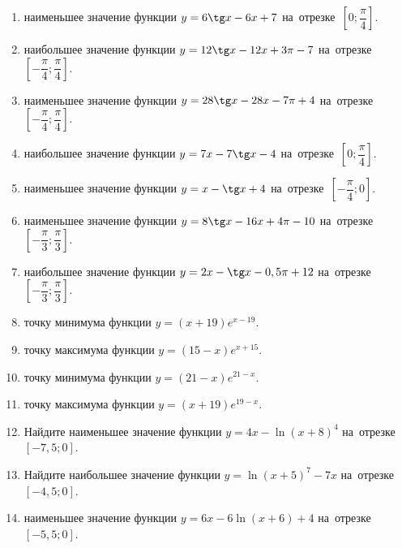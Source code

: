 \documentclass[a4paper,10pt]{article}
\begin{document}
\begin{enumerate}
\item {} наименьшее значение функции $y=6\tg x-6x+7$ на~отрезке~$\left[0;\dfrac{\pi }{4}\right]$.

\item {} наибольшее значение функции $y=12\tg x-12x+3\pi -7$ на~отрезке~$\left[-\dfrac{\pi }{4};\dfrac{\pi }{4}\right]$.

\item {} наименьшее значение функции $y=28\tg x-28x-7\pi +4$ на~отрезке~$\left[-\dfrac{\pi }{4};\dfrac{\pi }{4}\right]$.

\item {} наибольшее значение функции $y=7x-7\tg x-4$ на~отрезке~$\left[0;\dfrac{\pi }{4}\right]$.

\item {} наименьшее значение функции $y=x-\tg x+4$ на~отрезке~$\left[-\dfrac{\pi }{4};0\right]$.

\item {} наименьшее значение функции $y=8\tg x-16x+4\pi -10$ на~отрезке~$\left[-\dfrac{\pi }{3};\dfrac{\pi }{3}\right]$.

\item {} наибольшее значение функции $y=2x-\tg x-0,5\pi +12$ на~отрезке~$\left[-\dfrac{\pi }{3};\dfrac{\pi }{3}\right]$.

\item {} точку минимума функции $y=\left(x+19\right)e^{x-19}$.

\item {} точку максимума функции $y=\left(15-x\right)e^{x+15}$.

\item {} точку минимума функции $y=\left(21-x\right)e^{21-x}$.

\item {} точку максимума функции $y=\left(x+19\right)e^{19-x}$.

\item Найдите наименьшее значение функции $y=4x-\ln \left(x+8\right)^4$ на~отрезке~$\left[-7,5;0\right]$.

\item Найдите наибольшее значение функции $y=\ln \left(x+5\right)^7-7x$ на~отрезке~$\left[-4,5;0\right]$.

\item {} наименьшее значение функции $y=6x-6\ln \left(x+6\right)+4$ на~отрезке~$\left[-5,5;0\right]$.


\end{enumerate}
\end{document}

